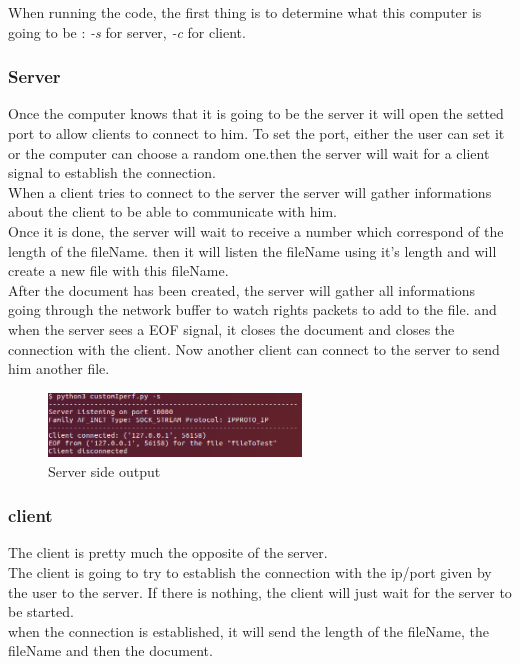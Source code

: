\documentclass[a4paper]{article}
\begin{document}
When running the code, the first thing is to determine what this computer is going to be : \textit{-s} for server, \textit{-c} for client.

\subsubsection*{Server}

Once the computer knows that it is going to be the server it will open the setted port to allow clients to connect to him. To set the port, either the user can set it or the computer can choose a random one.then the server will wait for a client signal to establish the connection.\\
When a client tries to connect to the server the server will gather informations about the client to be able to communicate with him.\\
 Once it is done, the server will wait to receive a number which correspond of the length of the fileName. then it will listen the fileName using it's length and will create a new file with this fileName.\\
After the document has been created, the server will gather all informations going through the network buffer to watch rights packets to add to the file. and when the server sees a EOF signal, it closes the document and closes the connection with the client.
Now another client can connect to the server to send him another file.

\begin{figure}[H]
\centering
\includegraphics[width=0.6\textwidth]{serverSide.png}
\caption{Server side output}
\end{figure}

\subsubsection*{client}

The client is pretty much the opposite of the server.\\
The client is going to try to establish the connection with the ip/port given by the user to the server. If there is nothing, the client will just wait for the server to be started.\\
when the connection is established, it will send the length of the fileName, the fileName and then the document.
\end{document}

